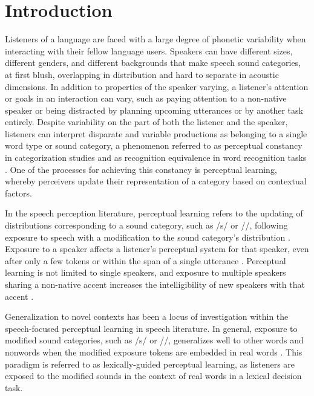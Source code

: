 
\chapter{Introduction}

Listeners of a language are faced with a large degree of phonetic variability when interacting with their fellow language users.  
Speakers can have different sizes, different genders, and different backgrounds that make speech sound categories, at first blush, overlapping in distribution and hard to separate in acoustic dimensions.
In addition to properties of the speaker varying, a listener's attention or goals in an interaction can vary, such as paying attention to a non-native speaker or being distracted by planning upcoming utterances or by another task entirely.  
Despite variability on the part of both the listener and the speaker, listeners can interpret disparate and variable productions as belonging to a single word type or sound category, a phenomenon referred to as perceptual constancy in categorization studies \citep{Shankweiler1977, Kuhl1979} and as recognition equivalence in word recognition tasks \citep{Sumner2013}.
One of the processes for achieving this constancy is perceptual learning, whereby perceivers update their representation of a category based on contextual factors.

In the speech perception literature, perceptual learning refers to the updating of distributions corresponding to a sound category, such as /s/ or /\textesh/, following exposure to speech with a modification to the sound category's distribution \citep{Norris2003}.
Exposure to a speaker affects a listener's perceptual system for that speaker,  even after only a few tokens \citep{Vroomen2007, Kraljic2008} or within the span of a single utterance \citep{Ladefoged1957}.
Perceptual learning is not limited to single speakers, and exposure to multiple speakers sharing a non-native accent increases the intelligibility of new speakers with that accent \citep{Bradlow2008}.

Generalization to novel contexts has been a locus of investigation within the speech-focused perceptual learning in speech literature. In general, exposure to modified sound categories, such as /s/ or /\textesh/, generalizes well to other words and nonwords when the modified exposure tokens are embedded in real words \citep{Norris2003, Reinisch2013}.  
This paradigm is referred to as lexically-guided perceptual learning, as listeners are exposed to the modified sounds in the context of real words in a lexical decision task.

